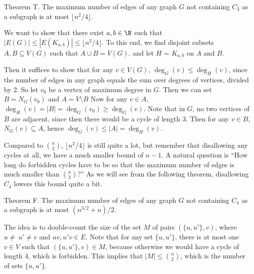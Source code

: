 \proclaim Theorem T. The maximum number of edges of any graph $G$ not containing $C_3$ as a subgraph is at most $\lfloor n^2/4 \rfloor$.

\proof We want to show that there exist $a,b\in \N$ such that $|E(G)|\leq |E(K_{a,b})| \leq \lfloor n^2/4 \rfloor$. To this end, we find disjoint subsets $A,B\subseteq V(G)$ such that $A\cup B = V(G)$. and let $H$ = $K_{a,b}$ on $A$ and $B$.

Then it suffices to show that for any $v\in V(G)$, $\deg_G(v) \leq \deg_H(v)$, since the number of edges in any graph equals the sum over degrees of vertices, divided by 2. So let $v_0$ be a vertex of maximum degree in $G$. Then we can set $B = N_G(v_0)$ and $A = V\setminus B$ Now for any $v\in A$, $\deg_H(v) = |B| = \deg_G(v_0) \geq \deg_G(v)$. Note that in $G$, no two vertices of $B$ are adjacent, since then there would be a cycle of length 3. Then for any $v\in B$, $N_G(v)\subseteq A$, hence $\deg_G(v)\leq |A| = \deg_H(v)$.\slug

Compared to ${n\choose 2}$, $\lfloor n^2/4 \rfloor$ is still quite a lot, but remember that disallowing any cycles at all, we have a much smaller bound of $n-1$. A natural question is ``How long do forbidden cycles have to be so that the maximum number of edges is much smaller than ${n\choose 2}$?'' As we will see from the following theorem, disallowing $C_4$ lowers this bound quite a bit.

\proclaim Theorem F. The maximum number of edges of any graph $G$ not containing $C_4$ as a subgraph is at most $(n^{3/2} + n) / 2$.

\proof The idea is to double-count the size of the set $M$ of pairs $(\{u, u'\}, v)$, where $u\neq\ u'\neq v$ and $uv, u'v\in E$. Note that for any set $\{u, u'\}$, there is at most one $v\in V$ such that $(\{u, u'\}, v)\in M$, because otherwise we would have a cycle of length 4, which is forbidden. This implies that $|M|\leq {n\choose 2}$, which is the number of sets $\{u, u'\}$.

